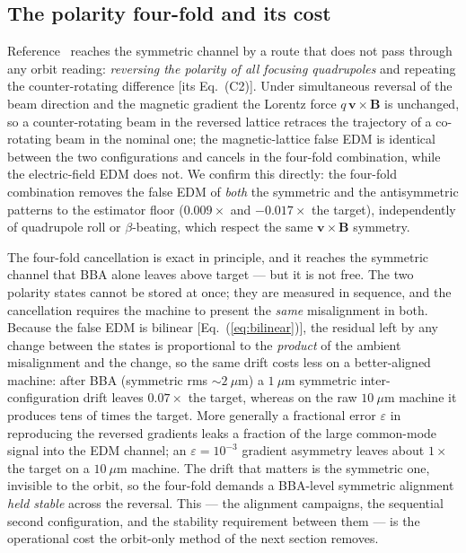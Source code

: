 \documentclass[aps,prab,reprint,superscriptaddress,nofootinbib]{revtex4-2}
\begin{document}
\subsection{The polarity four-fold and its cost}
\label{sec:fourfold}

Reference~\cite{omarov} reaches the symmetric channel by a route that does not
pass through any orbit reading: \emph{reversing the polarity of all focusing
quadrupoles} and repeating the counter-rotating difference [its Eq.~(C2)].
Under simultaneous reversal of the beam direction and the magnetic gradient the
Lorentz force $q\,\bm v\times\bm B$ is unchanged, so a counter-rotating beam in
the reversed lattice retraces the trajectory of a co-rotating beam in the
nominal one; the magnetic-lattice false EDM is identical between the two
configurations and cancels in the four-fold combination, while the
electric-field EDM does not.  We confirm this directly: the four-fold
combination removes the false EDM of \emph{both} the symmetric and the
antisymmetric patterns to the estimator floor ($0.009\times$ and $-0.017\times$
the target), independently of quadrupole roll or $\beta$-beating, which respect
the same $\bm v\times\bm B$ symmetry.

The four-fold cancellation is exact in principle, and it reaches the symmetric
channel that BBA alone leaves above target --- but it is not free.  The two
polarity states cannot be stored at once; they are measured in sequence, and
the cancellation requires the machine to present the \emph{same} misalignment in
both.  Because the false EDM is bilinear [Eq.~(\ref{eq:bilinear})], the residual
left by any change between the states is proportional to the \emph{product} of
the ambient misalignment and the change, so the same drift costs less on a
better-aligned machine: after BBA (symmetric rms $\sim\!2~\mu$m) a $1~\mu$m
symmetric inter-configuration drift leaves $0.07\times$ the target, whereas on
the raw $10~\mu$m machine it produces tens of times the target.  More generally
a fractional error $\varepsilon$ in reproducing the reversed gradients leaks a
fraction of the large common-mode signal into the EDM channel; an
$\varepsilon=10^{-3}$ gradient asymmetry leaves about $1\times$ the target on a
$10~\mu$m machine.  The drift that matters is the symmetric one, invisible to
the orbit, so the four-fold demands a BBA-level symmetric alignment \emph{held
stable} across the reversal.  This --- the alignment campaigns, the sequential
second configuration, and the stability requirement between them --- is the
operational cost the orbit-only method of the next section removes.
\end{document}
